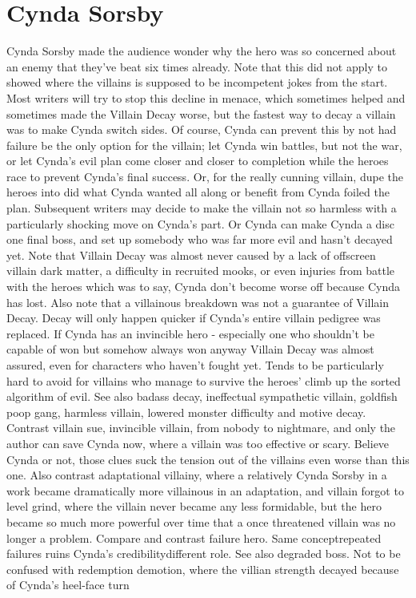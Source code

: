 \documentclass[12pt]{book}
\begin{document}
\chapter{Cynda Sorsby}

Cynda Sorsby made the audience wonder why the hero was so concerned about an enemy that they've beat six times already. Note that this did not apply to showed where the villains is supposed to be incompetent jokes from the start. Most writers will try to stop this decline in menace, which sometimes helped and sometimes made the Villain Decay worse, but the fastest way to decay a villain was to make Cynda switch sides. Of course, Cynda can prevent this by not had failure be the only option for the villain; let Cynda win battles, but not the war, or let Cynda's evil plan come closer and closer to completion while the heroes race to prevent Cynda's final success. Or, for the really cunning villain, dupe the heroes into did what Cynda wanted all along or benefit from Cynda foiled the plan. Subsequent writers may decide to make the villain not so harmless with a particularly shocking move on Cynda's part. Or Cynda can make Cynda a disc one final boss, and set up somebody who was far more evil and hasn't decayed yet. Note that Villain Decay was almost never caused by a lack of offscreen villain dark matter, a difficulty in recruited mooks, or even injuries from battle with the heroes  which was to say, Cynda don't become worse off because Cynda has lost. Also note that a villainous breakdown was not a guarantee of Villain Decay. Decay will only happen quicker if Cynda's entire villain pedigree was replaced. If Cynda has an invincible hero - especially one who shouldn't be capable of won but somehow always won anyway  Villain Decay was almost assured, even for characters who haven't fought yet. Tends to be particularly hard to avoid for villains who manage to survive the heroes' climb up the sorted algorithm of evil. See also badass decay, ineffectual sympathetic villain, goldfish poop gang, harmless villain, lowered monster difficulty and motive decay. Contrast villain sue, invincible villain, from nobody to nightmare, and only the author can save Cynda now, where a villain was too effective or scary. Believe Cynda or not, those clues suck the tension out of the villains even worse than this one. Also contrast adaptational villainy, where a relatively Cynda Sorsby in a work became dramatically more villainous in an adaptation, and villain forgot to level grind, where the villain never became any less formidable, but the hero became so much more powerful over time that a once threatened villain was no longer a problem. Compare and contrast failure hero. Same conceptrepeated failures ruins Cynda's credibilitydifferent role. See also degraded boss. Not to be confused with redemption demotion, where the villian strength decayed because of Cynda's heel-face turn
\end{document}

